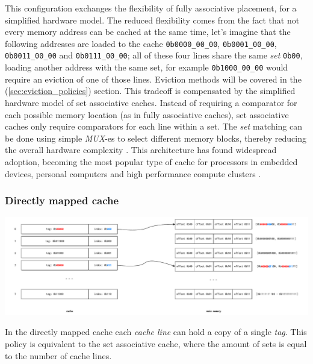 \noindent This configuration exchanges the flexibility of fully associative placement, for a simplified hardware model. The reduced flexibility comes from the fact that
not every memory address can be cached at the same time, let's imagine that the following addresses are loaded to the cache \texttt{0b0000\_00\_00}, \texttt{0b0001\_00\_00}, \texttt{0b0011\_00\_00}
and \texttt{0b0111\_00\_00}; all of these four lines share the same \textit{set} \texttt{0b00}, loading another address with the same set, for example \texttt{0b1000\_00\_00} would require 
an eviction of one of those lines. Eviction methods will be covered in the (\ref{sec:eviction_policies}) section. 
This tradeoff is compensated by the simplified hardware model of set associative caches. Instead of requiring a comparator for each possible memory location (as in fully
associative caches), set associative caches only require comparators for each line within a set. The \textit{set} matching can be done using simple \textit{MUX}-es to select
different memory blocks, thereby reducing the overall hardware complexity \cite{whatevery}.
This architecture has found widespread adoption, becoming the most popular type of cache for processors in embedded devices, personal computers and high performance compute clusters
\cite{digitaldesgnandcomp, evalofcaceh}.

\subsubsection{Directly mapped cache}
\begin{center}
	\centering
	\includegraphics[width=\textwidth]{figures/02-background/dir_map_mem.pdf}
	\label{fig:dir_map_mem}
\end{center}

\noindent In the directly mapped cache each \textit{cache line} can hold a copy of a single \textit{tag}. This policy is equivalent to the set associative cache, where the amount of sets is equal to
the number of cache lines.

